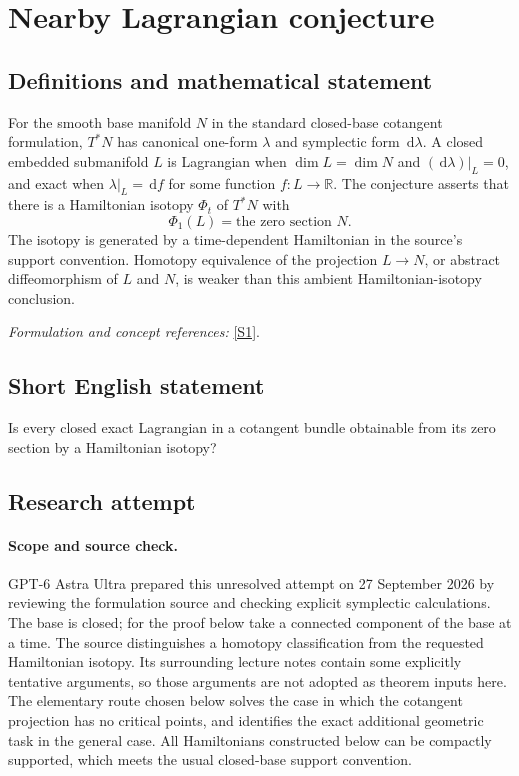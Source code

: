 \documentclass[11pt]{article}
\begin{document}
\section*{\texorpdfstring{Nearby Lagrangian conjecture}{Nearby Lagrangian conjecture}}\label{11300005}
\subsection{Definitions and mathematical statement}
For the smooth base manifold $N$ in the standard closed-base cotangent formulation, $T^*N$ has canonical one-form $\lambda$ and symplectic form ${\,\mathrm{d}}\lambda$. A closed embedded submanifold $L$ is Lagrangian when $\dim L=\dim N$ and $({\,\mathrm{d}}\lambda)|_L=0$, and exact when $\lambda|_L={\,\mathrm{d}} f$ for some function $f:L\to{\mathbb{R}}$. The conjecture asserts that there is a Hamiltonian isotopy $\Phi_t$ of $T^*N$ with
\[
 \Phi_1(L)=\text{the zero section }N.
\]
The isotopy is generated by a time-dependent Hamiltonian in the source's support convention. Homotopy equivalence of the projection $L\to N$, or abstract diffeomorphism of $L$ and $N$, is weaker than this ambient Hamiltonian-isotopy conclusion.
\par\smallskip\textit{Formulation and concept references:} \href{https://www.math.stonybrook.edu/~fzheng/seminar-f24/notes/week-1-2.pdf}{[S1]}.

\subsection{Short English statement}
Is every closed exact Lagrangian in a cotangent bundle obtainable from its zero section by a Hamiltonian isotopy?
\subsection{Research attempt}
\paragraph{Scope and source check.}
GPT-6 Astra Ultra prepared this unresolved attempt on 27 September 2026
by reviewing the formulation source and checking explicit symplectic
calculations. The base is closed; for the proof below take a connected
component of the base at a time. The source distinguishes a homotopy
classification from the requested Hamiltonian isotopy. Its surrounding
lecture notes contain some explicitly tentative arguments, so those
arguments are not adopted as theorem inputs here. The elementary route
chosen below solves the case in which the cotangent projection has no
critical points, and identifies the exact additional geometric task in
the general case. All Hamiltonians constructed below can be compactly
supported, which meets the usual closed-base support convention.
\end{document}
